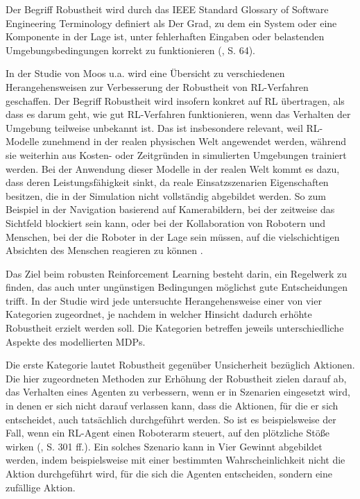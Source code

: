 \label{robustheit}

Der Begriff Robustheit wird durch das IEEE Standard Glossary of Software Engineering Terminology definiert als \glqq Der Grad, zu dem ein System oder eine Komponente in der Lage ist, unter fehlerhaften Eingaben oder belastenden Umgebungsbedingungen korrekt zu funktionieren\grqq{} (\cite{IEEE.1990}, S. 64).

In der Studie von Moos u.a. wird eine Übersicht zu verschiedenen Herangehensweisen zur Verbesserung der Robustheit von RL-Verfahren geschaffen. Der Begriff Robustheit wird insofern konkret auf RL übertragen, als dass es darum geht, wie gut RL-Verfahren funktionieren, wenn das Verhalten der Umgebung teilweise unbekannt ist. Das ist insbesondere relevant, weil RL-Modelle zunehmend in der realen physischen Welt angewendet werden, während sie weiterhin aus Kosten- oder Zeitgründen in simulierten Umgebungen trainiert werden. Bei der Anwendung dieser Modelle in der realen Welt kommt es dazu, dass deren Leistungsfähigkeit sinkt, da reale Einsatzszenarien Eigenschaften besitzen, die in der Simulation nicht vollständig abgebildet werden. So zum Beispiel in der Navigation basierend auf Kamerabildern, bei der zeitweise das Sichtfeld blockiert sein kann, oder bei der Kollaboration von Robotern und Menschen, bei der die Roboter in der Lage sein müssen, auf die vielschichtigen Absichten des Menschen reagieren zu können \cite{Moos.2022}\cite{Ni.2021}.

Das Ziel beim robusten Reinforcement Learning besteht darin, ein Regelwerk zu finden, das auch unter ungünstigen Bedingungen möglichst gute Entscheidungen trifft. In der Studie wird jede untersuchte Herangehensweise einer von vier Kategorien zugeordnet, je nachdem in welcher Hinsicht dadurch erhöhte Robustheit erzielt werden soll. Die Kategorien betreffen jeweils unterschiedliche Aspekte des modellierten MDPs.

Die erste Kategorie lautet Robustheit gegenüber Unsicherheit bezüglich Aktionen. Die hier zugeordneten Methoden zur Erhöhung der Robustheit zielen darauf ab, das Verhalten eines Agenten zu verbessern, wenn er in Szenarien eingesetzt wird, in denen er sich nicht darauf verlassen kann, dass die Aktionen, für die er sich entscheidet, auch tatsächlich durchgeführt werden. So ist es beispielsweise der Fall, wenn ein RL-Agent einen Roboterarm steuert, auf den plötzliche Stöße wirken (\cite{Moos.2022}, S. 301 ff.). Ein solches Szenario kann in Vier Gewinnt abgebildet werden, indem beispielsweise mit einer bestimmten Wahrscheinlichkeit nicht die Aktion durchgeführt wird, für die sich die Agenten entscheiden, sondern eine zufällige Aktion.

